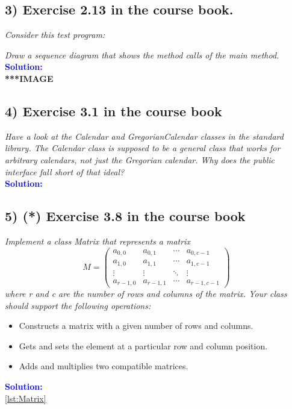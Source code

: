 \documentclass{article}
\begin{document}
\subsection*{3) Exercise 2.13 in the course book.}
\textit{Consider this test program:}

\textit{Draw a sequence diagram that shows the method calls of the main method.} \\
\indent \textbf{\textcolor{blue}{Solution:}} \\
\textbf{***IMAGE}

\subsection*{4) Exercise 3.1 in the course book}
\textit{
    Have a look at the Calendar and GregorianCalendar classes in
    the standard library. The Calendar class is supposed to be a general class that works for arbitrary
    calendars, not just the Gregorian calendar. Why does the public interface fall short of that ideal?}\\
    \indent \textbf{\textcolor{blue}{Solution:}} \\


\subsection{5) (*) Exercise 3.8 in the course book}
\textit{Implement a class Matrix that represents a matrix}\\
$$ 
M = \left( 
\begin{matrix}
a_{0,0} & a_{0,1} & \cdots & a_{0,c-1} \\
a_{1,0} & a_{1,1} & \cdots & a_{1,c-1} \\
\vdots & \vdots & \ddots & \vdots \\
a_{r-1,0} & a_{r-1,1} & \cdots & a_{r-1,c-1} 
\end{matrix} \right)
$$
\textit{
where r and c are the number of rows and columns of the matrix. Your class should support the
following operations:}\\
\begin{itemize}
    \item Constructs a matrix with a given number of rows and columns.
    \item Gets and sets the element at a particular row and column position.
    \item Adds and multiplies two compatible matrices.
\end{itemize}
\indent \textbf{\textcolor{blue}{Solution:}} \\
\ref{lst:Matrix}
\end{document}
